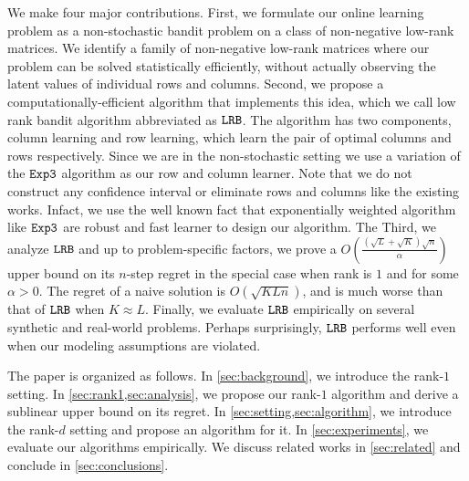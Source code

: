 We make four major contributions. First, we formulate our online learning problem as a non-stochastic bandit problem on a class of non-negative low-rank matrices. We identify a family of non-negative low-rank matrices where our problem can be solved statistically efficiently, without actually observing the latent values of individual rows and columns. Second, we propose a computationally-efficient algorithm that implements this idea, which we call low rank bandit algorithm abbreviated as ${\tt LRB}$. The algorithm has two components, column learning and row learning, which learn the pair  of optimal columns and rows respectively. Since we are in the non-stochastic setting we use a variation of the ${\tt Exp3}$ \citep{auer2002nonstochastic} algorithm as our row and column learner. Note that we do not construct any confidence interval or eliminate rows and columns like the existing works. Infact, we use the well known fact that exponentially weighted algorithm like ${\tt Exp3}$ are robust and fast learner to design our algorithm. The Third, we analyze ${\tt LRB}$ and up to problem-specific factors, we prove a $O\left(\frac{\left(\sqrt{L } + \sqrt{K }\right)\sqrt{n}}{\alpha}\right)$ upper bound on its $n$-step regret in the special case when rank is $1$ and for some $\alpha > 0$. The regret of a naive solution is $O(\sqrt{K L n})$, and is much worse than that of ${\tt LRB}$ when $K \approx L$. Finally, we evaluate ${\tt LRB}$ empirically on several synthetic and real-world problems. Perhaps surprisingly, ${\tt LRB}$ performs well even when our modeling assumptions are violated.

The paper is organized as follows. In \cref{sec:background}, we introduce the rank-$1$ setting. In \cref{sec:rank1,sec:analysis}, we propose our rank-$1$ algorithm and derive a sublinear upper bound on its regret. In \cref{sec:setting,sec:algorithm}, we introduce the rank-$d$ setting and propose an algorithm for it. In \cref{sec:experiments}, we evaluate our algorithms empirically. We discuss related works in \cref{sec:related} and conclude in \cref{sec:conclusions}. 
